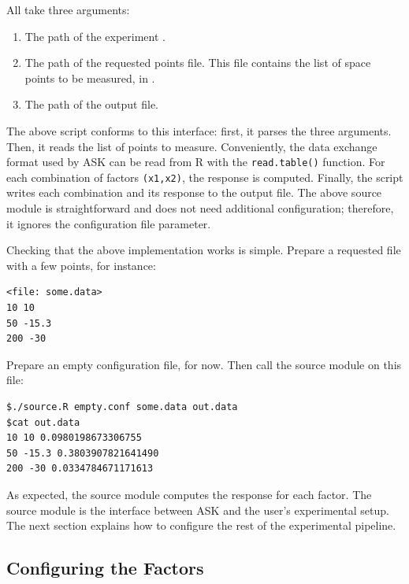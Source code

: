 All  take three arguments:
\begin{enumerate}
	\item The path of the experiment .
	\item The path of the requested points file. This file contains the list of space points to be measured, in .
	\item The path of the output file.
\end{enumerate}

The above script conforms to this interface: first, it parses the three arguments. Then, it reads the list of points to measure. Conveniently, the data exchange format used by ASK can be read from R with the \texttt{read.table()} function. For each combination of factors \texttt{(x1,x2)}, the response is computed. Finally, the script writes each combination and its response to the output file.
The above source module is straightforward and does not need additional configuration; therefore, it ignores the configuration file parameter.

Checking that the above implementation works is simple. Prepare a requested file with a few points, for instance:

\begin{verbatim}
<file: some.data>
10 10 
50 -15.3 
200 -30 
\end{verbatim}

Prepare an empty configuration file, for now.
Then call the source module on this file:

\begin{verbatim}
$./source.R empty.conf some.data out.data
$cat out.data
10 10 0.0980198673306755
50 -15.3 0.3803907821641490
200 -30 0.0334784671171613
\end{verbatim}

As expected, the source module computes the response for each factor.
The source module is the interface between ASK and the user's experimental setup. The next section explains how to configure the rest of the experimental pipeline.

\subsection{Configuring the Factors}

